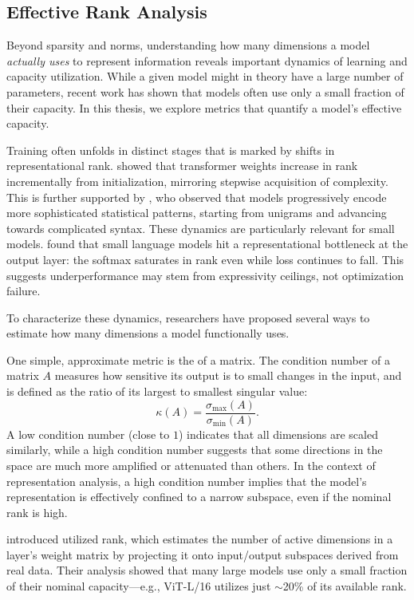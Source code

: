 \subsection{Effective Rank Analysis}

Beyond sparsity and norms, understanding how many dimensions a model \textit{actually uses} to represent information reveals important dynamics of learning and capacity utilization. While a given model might in theory have a large number of parameters, recent work has shown that models often use only a small fraction of their capacity. In this thesis, we explore metrics that quantify a model's effective capacity.

Training often unfolds in distinct stages that is marked by shifts in representational rank. \citet{boix-adsera2023rank} showed that transformer weights increase in rank incrementally from initialization, mirroring stepwise acquisition of complexity. This is further supported by \citet{belrose2024neural}, who observed that models progressively encode more sophisticated statistical patterns, starting from unigrams and advancing towards complicated syntax. These dynamics are particularly relevant for small models. \citet{godey2024small} found that small language models hit a representational bottleneck at the output layer: the softmax saturates in rank even while loss continues to fall. This suggests underperformance may stem from expressivity ceilings, not optimization failure.

To characterize these dynamics, researchers have proposed several ways to estimate how many dimensions a model functionally uses. 

One simple, approximate metric is the  of a matrix. The condition number of a matrix $A$ measures how sensitive its output is to small changes in the input, and is defined as the ratio of its largest to smallest singular value:
\[
\kappa(A) = \frac{\sigma_{\max}(A)}{\sigma_{\min}(A)}.
\]
A low condition number (close to $1$) indicates that all dimensions are scaled similarly, while a high condition number suggests that some directions in the space are much more amplified or attenuated than others. In the context of representation analysis, a high condition number implies that the model's representation is effectively confined to a narrow subspace, even if the nominal rank is high.

\citet{garg2025utilizedrank} introduced utilized rank, which estimates the number of active dimensions in a layer's weight matrix by projecting it onto input/output subspaces derived from real data. Their analysis showed that many large models use only a small fraction of their nominal capacity—e.g., ViT-L/16 utilizes just $\sim$20\% of its available rank.

